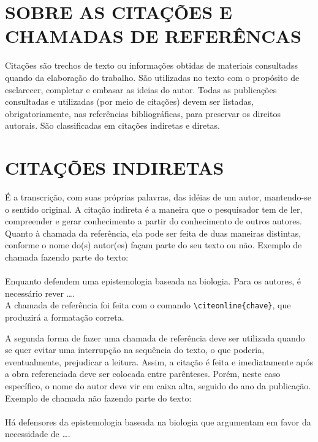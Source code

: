 \chapter{SOBRE AS CITAÇÕES E CHAMADAS DE REFERÊNCAS}
\label{chap:apSobreCita}

Citações são trechos de texto ou informações obtidas de materiais consultadss quando da elaboração do trabalho. São utilizadas no texto com o propósito de esclarecer, completar e embasar as ideias do autor. Todas as publicações consultadas e utilizadas (por meio de citações) devem ser listadas, obrigatoriamente, nas referências bibliográficas, para preservar os direitos autorais. São classificadas em citações indiretas e diretas.

\chapter{CITAÇÕES INDIRETAS}
\label{chap:citacoesLivres}

É a transcrição, com suas próprias palavras, das idéias de um autor, mantendo-se o sentido original. A citação indireta é a maneira que o pesquisador tem de ler, compreender e gerar conhecimento a partir do conhecimento de outros autores. Quanto à chamada da referência, ela pode ser feita de duas maneiras distintas, conforme o nome do(s) autor(es) façam parte do seu texto ou não. Exemplo de chamada fazendo parte do texto:\\
\\Enquanto {} defendem uma epistemologia baseada na biologia. Para os autores, é necessário rever \ldots.\\

A chamada de referência foi feita com o comando \verb|\citeonline{chave}|, que produzirá a formatação correta.

A segunda forma de fazer uma chamada de referência deve ser utilizada quando se quer evitar uma interrupção na sequência do texto, o que poderia, eventualmente, prejudicar a leitura. Assim, a citação é feita e imediatamente após a obra referenciada deve ser colocada entre parênteses. Porém, neste caso específico, o nome do autor deve vir em caixa alta, seguido do ano da publicação. Exemplo de chamada não fazendo parte do texto:\\
\\Há defensores da epistemologia baseada na biologia que argumentam em favor da necessidade de \ldots \cite{Maturana2003}.\\

